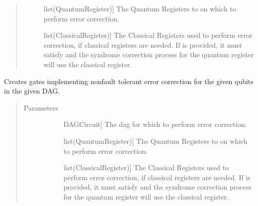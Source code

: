 \documentclass[letterpaper,10pt,english]{sphinxmanual}
\begin{document}
\begin{fulllineitems}
\begin{fulllineitems}
\begin{quote}
\begin{description}
\begin{description}
\item[{}] \leavevmode{[}list(QuantumRegister){]}
The Quantum Registers to on which to perform error correction.

\item[{}] \leavevmode{[}list(ClassicalRegister){]}
The Classical Registers used to perform error correction, if classical registers are needed. If  is provided, it must satisfy  and the syndrome correction process for the  quantum register will use the  classical register.

\end{description}

\end{description}\end{quote}

\end{fulllineitems}


\begin{fulllineitems}
\label{\detokenize{Steane:Steane.SteaneErrorCorrector.errorCorrectDag}}
Creates gates implementing non\sphinxhyphen{}fault tolerant error correction for the given qubits in the given DAG.
\begin{quote}\begin{description}
\item[{Parameters}] \leavevmode\begin{description}
\item[{}] \leavevmode{[}DAGCircuit{]}
The dag for which to perform error correction.

\item[{}] \leavevmode{[}list(QuantumRegister){]}
The Quantum Registers to on which to perform error correction.

\item[{}] \leavevmode{[}list(ClassicalRegister){]}
The Classical Registers used to perform error correction, if classical registers are needed. If  is provided, it must satisfy  and the syndrome correction process for the  quantum register will use the  classical register.


\end{description}
\end{description}
\end{quote}
\end{fulllineitems}
\end{fulllineitems}
\end{document}
